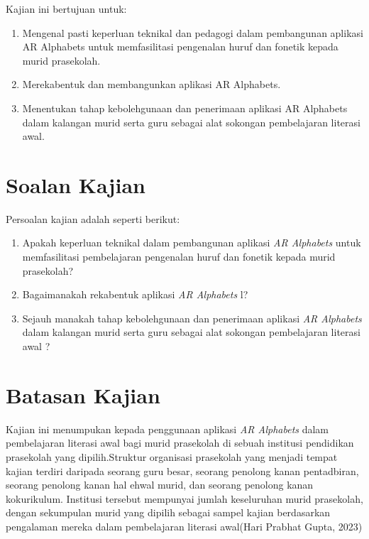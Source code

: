 Kajian ini bertujuan untuk:
\begin{enumerate}[label=\roman*.]
    \item Mengenal pasti keperluan teknikal dan pedagogi dalam pembangunan aplikasi AR Alphabets untuk memfasilitasi pengenalan huruf dan fonetik kepada murid prasekolah.
    \item Merekabentuk dan membangunkan aplikasi AR Alphabets.
    \item Menentukan tahap kebolehgunaan dan penerimaan aplikasi AR Alphabets dalam kalangan murid serta guru sebagai alat sokongan pembelajaran literasi awal.
\end{enumerate}

\section{Soalan Kajian}
Persoalan kajian adalah seperti berikut:

\begin{enumerate}[label=\roman*.]
    \item Apakah keperluan teknikal  dalam pembangunan aplikasi \textit{AR Alphabets} untuk memfasilitasi pembelajaran pengenalan huruf dan fonetik kepada murid prasekolah?
    \item Bagaimanakah rekabentuk aplikasi \textit{AR Alphabets }l?
    \item Sejauh manakah tahap kebolehgunaan dan penerimaan aplikasi \textit{AR Alphabets }dalam kalangan murid serta guru sebagai alat sokongan pembelajaran literasi awal ?
\end{enumerate}
           

\section{Batasan Kajian}

Kajian ini menumpukan kepada penggunaan aplikasi \emph{AR Alphabets} dalam pembelajaran literasi awal bagi murid prasekolah di sebuah institusi pendidikan prasekolah yang dipilih.Struktur organisasi prasekolah yang menjadi tempat kajian terdiri daripada seorang guru besar, seorang penolong kanan pentadbiran, seorang penolong kanan hal ehwal murid, dan seorang penolong kanan kokurikulum. Institusi tersebut mempunyai jumlah keseluruhan murid prasekolah, dengan sekumpulan murid yang dipilih sebagai sampel kajian berdasarkan pengalaman mereka dalam pembelajaran literasi awal(Hari Prabhat Gupta, 2023) \\


